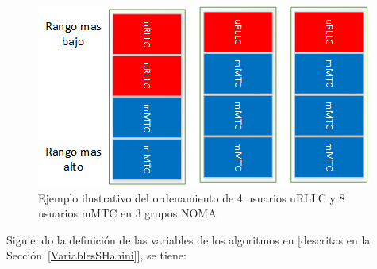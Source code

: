 \begin{figure}[th]
    \centering
    \includegraphics[scale=.8]{Figures/EjemploNOMAclusters}
    \decoRule
    \caption[Ejemplo ilustrativo del ordenamiento de usuarios en los grupos NOMA]{Ejemplo ilustrativo del ordenamiento de 4 usuarios uRLLC y 8 usuarios mMTC en 3 grupos NOMA}
    \label{fig:NOMAgrupoexample}
\end{figure}

Siguiendo la definición de las variables de los algoritmos en \parencite{Shahini2019} [descritas en la Sección~\ref{VariablesSHahini}], se tiene:\newline

\makeatletter
\def\algbackskip{\hskip-\ALG@thistlm}
\makeatother

